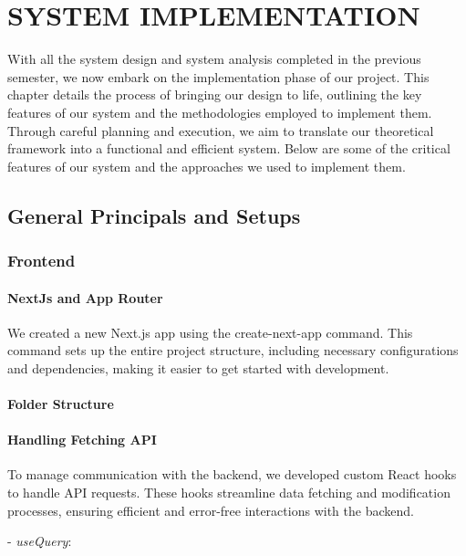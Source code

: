 \chapter{SYSTEM IMPLEMENTATION}
With all the system design and system analysis completed in the previous semester, we now embark on the implementation phase of our project. This chapter details the process of bringing our design to life, outlining the key features of our system and the methodologies employed to implement them. Through careful planning and execution, we aim to translate our theoretical framework into a functional and efficient system. Below are some of the critical features of our system and the approaches we used to implement them.

\section{General Principals and Setups}
\subsection{Frontend}

\subsubsection*{NextJs and App Router}
We created a new Next.js app using the create-next-app command. This command sets up the entire project structure, including necessary configurations and dependencies, making it easier to get started with development.


\subsubsection*{Folder Structure}

\subsubsection*{Handling Fetching API}

To manage communication with the backend, we developed custom React hooks to handle API requests. These hooks streamline data fetching and modification processes, ensuring efficient and error-free interactions with the backend.

- \textit{useQuery}:

